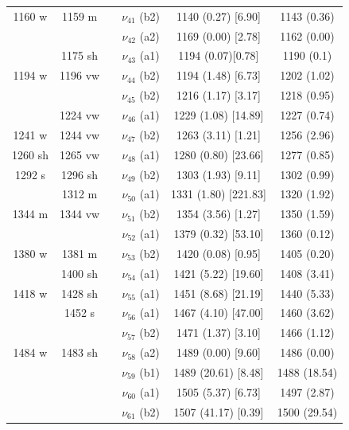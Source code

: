 \begin{table}[H]
\begin{center}
\begin{tabular}{c c c c c c}
 1160 w & 1159 m &  & $\nu_{41}$ (b2) & 1140 (0.27) [6.90] & 1143 (0.36) \\ 
 &  &  & $\nu_{42}$ (a2) & 1169 (0.00) [2.78] & 1162 (0.00) \\ 
 & 1175 sh &  & $\nu_{43}$ (a1) & 1194 (0.07)[0.78] & 1190 (0.1) \\ 
 1194 w & 1196 vw &  & $\nu_{44}$ (b2) & 1194 (1.48) [6.73]  & 1202 (1.02) \\ 
 &  &  &  $\nu_{45}$ (b2) & 1216 (1.17) [3.17] & 1218 (0.95) \\ 
 & 1224 vw &  &   $\nu_{46}$ (a1) & 1229 (1.08) [14.89] & 1227 (0.74) \\ 
 1241 w & 1244 vw &  &   $\nu_{47}$ (b2) &  1263 (3.11) [1.21] & 1256 (2.96) \\ 
 1260 sh & 1265 vw &  &   $\nu_{48}$ (a1) & 1280 (0.80) [23.66] &   1277 (0.85) \\ 
 1292 s & 1296 sh &  & $\nu_{49}$ (b2) & 1303 (1.93) [9.11]  & 1302 (0.99) \\ 
 & 1312 m & \multicolumn{1}{l}{} & $\nu_{50}$ (a1) & 1331 (1.80) [221.83] & 1320 (1.92) \\ 
 1344 m &  1344 vw  & \multicolumn{1}{l}{} & $\nu_{51}$ (b2) & 1354 (3.56) [1.27]  & 1350 (1.59) \\ 
 &  & \multicolumn{1}{l}{} & $\nu_{52}$ (a1) & 1379 (0.32) [53.10] & 1360 (0.12) \\ 
 1380 w & 1381 m & \multicolumn{1}{l}{} & $\nu_{53}$ (b2) & 1420 (0.08) [0.95] & 1405 (0.20) \\ 
 & 1400 sh & \multicolumn{1}{l}{} &  $\nu_{54}$ (a1) & 1421 (5.22) [19.60] & 1408 (3.41) \\ 
 1418 w & 1428 sh & \multicolumn{1}{l}{} &   $\nu_{55}$ (a1) &    1451 (8.68) [21.19] & 1440 (5.33) \\ 
 &    1452 s & \multicolumn{1}{l}{} &   $\nu_{56}$ (a1) &     1467 (4.10) [47.00]   & 1460 (3.62) \\ 
 &  & \multicolumn{1}{l}{} &   $\nu_{57}$ (b2) & 1471 (1.37) [3.10] & 1466 (1.12) \\ 
 1484 w &     1483 sh & \multicolumn{1}{l}{} & $\nu_{58}$ (a2) & 1489 (0.00) [9.60] & 1486 (0.00) \\
  &  & \multicolumn{1}{l}{} & $\nu_{59}$ (b1) & 1489 (20.61) [8.48] &  1488 (18.54) \\ 
  &  & \multicolumn{1}{l}{} & $\nu_{60}$ (a1) & 1505 (5.37) [6.73] &  1497 (2.87) \\ 
  &  & \multicolumn{1}{l}{} & $\nu_{61}$ (b2) & 1507 (41.17) [0.39] & 1500 (29.54) \\
 \bottomrule
\end{tabular}
\end{center}
\end{table}
 
